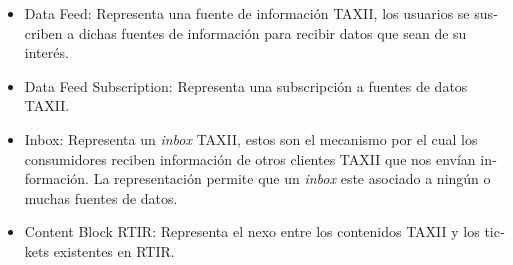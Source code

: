 \documentclass[11pt]{article}
\begin{document}
\begin{itemize}
\item \foreignlanguage{spanish}{Data Feed: Representa una fuente de información TAXII, los usuarios se suscriben a
dichas fuentes de información para recibir datos que sean de su interés. }
\item \foreignlanguage{spanish}{Data Feed Subscription: Representa una subscripción a fuentes de datos TAXII.}
\item \foreignlanguage{spanish}{Inbox: Representa un }\foreignlanguage{spanish}{\textit{inbox
}}\foreignlanguage{spanish}{TAXII, estos son el mecanismo por el cual los consumidores reciben información de otros
clientes TAXII que nos envían información. La representación permite que un
}\foreignlanguage{spanish}{\textit{inbox}}\foreignlanguage{spanish}{ este asociado a ningún o muchas fuentes de datos.
}
\item \foreignlanguage{spanish}{Content Block RTIR: Representa el nexo entre los contenidos TAXII y los tickets
existentes en RTIR.}
\end{itemize}

\bigskip

\newpage
\nocite{*}
 

\end{document}

